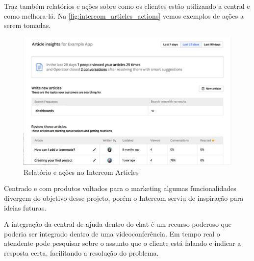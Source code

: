 Traz também relatórios e ações sobre como os clientes estão utilizando a central e como melhora-lá. Na \autoref{fig:intercom_articles_actions} vemos exemplos de ações a serem tomadas.

\begin{figure}[ht!]
	\centering 
		\includegraphics[scale=0.4]{figures/intercom-articles-actions.jpg} 
	\caption{Relatório e ações no Intercom Articles}
	\label{fig:intercom_articles_actions}
\end{figure}

Centrado e com produtos voltados para o marketing algumas funcionalidades divergem do objetivo desse projeto, porém o Intercom serviu de inspiração para ideias futuras. 

A integração da central de ajuda dentro do chat é um recurso poderoso que poderia ser integrado dentro de uma videoconferência. Em tempo real o atendente pode pesquisar sobre o assunto que o cliente está falando e indicar a resposta certa, facilitando a resolução do problema.

